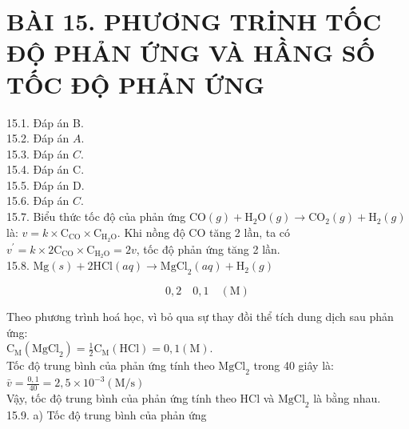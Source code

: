 \documentclass[10pt]{article}
\begin{document}
\section*{BÀI 15. PHƯƠNG TRİNH TỐC ĐỘ PHẢN ỨNG VÀ HẦNG SỐ TỐC ĐỘ PHẢN ỨNG}
15.1. Đáp án B.\\
15.2. Đáp án $A$.\\
15.3. Đáp án $C$.\\
15.4. Đáp án C.\\
15.5. Đáp án D.\\
15.6. Đáp án $C$.\\
15.7. Biểu thức tốc độ của phản ứng $\mathrm{CO}(g)+\mathrm{H}_{2} \mathrm{O}(g) \rightarrow \mathrm{CO}_{2}(g)+\mathrm{H}_{2}(g)$ là: $v=k \times \mathrm{C}_{\mathrm{CO}} \times \mathrm{C}_{\mathrm{H}_{2} \mathrm{O}}$. Khi nồng độ CO tăng 2 lần, ta có $v^{\prime}=k \times 2 \mathrm{C}_{\mathrm{CO}} \times \mathrm{C}_{\mathrm{H}_{2} \mathrm{O}}=2 v$, tốc độ phản ứng tăng 2 lần.\\
15.8. $\mathrm{Mg}(s)+2 \mathrm{HCl}(a q) \rightarrow \mathrm{MgCl}_{2}(a q)+\mathrm{H}_{2}(g)$

$$
0,2 \quad 0,1 \quad(\mathrm{M})
$$

Theo phương trình hoá học, vì bỏ qua sự thay đồi thể tích dung dịch sau phản ứng:\\
$\mathrm{C}_{\mathrm{M}}\left(\mathrm{MgCl}_{2}\right)=\frac{1}{2} \mathrm{C}_{\mathrm{M}}(\mathrm{HCl})=0,1(\mathrm{M})$.\\
Tốc độ trung bình của phản ứng tính theo $\mathrm{MgCl}_{2}$ trong 40 giây là:\\
$\bar{v}=\frac{0,1}{40}=2,5 \times 10^{-3}(\mathrm{M} / \mathrm{s})$\\
Vậy, tốc độ trung bình của phản ứng tính theo HCl và $\mathrm{MgCl}_{2}$ là bằng nhau.\\
15.9. a) Tốc độ trung bình của phản ứng
\end{document}
